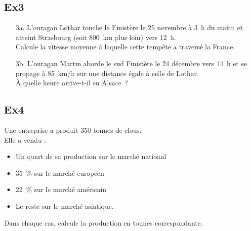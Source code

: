 \documentclass[12pt]{article}
\begin{document}
\begin{multicols}{2}
\subsection*{Ex3}
\begin{itemize}
\item[3a.] L'ouragan Lothar touche le Finistère le 25 novembre à 3 h du matin et atteint Strasbourg (soit 800 km plus loin) vers 12 h. \\
Calcule la vitesse moyenne à laquelle cette tempête a traversé la France.
\item[3b.] L'ouragan Martin aborde le sud Finistère le 24 décembre vers 14 h et se propage à 85 km/h sur une distance égale à celle de Lothar. \\
À quelle heure arrive-t-il en Alsace ?
\end{itemize}

\subsection*{Ex4}
Une entreprise a produit 350 tonnes de clous.\\
Elle a vendu : 
\begin{itemize}
\item Un quart de sa production sur le marché national
\item 35 \% sur le marché européen
\item 22 \% sur le marché américain
\item Le reste sur le marché asiatique.
\end{itemize}

 Dans chaque cas, calcule la production en tonnes correspondante.
\end{multicols}
\end{document}
